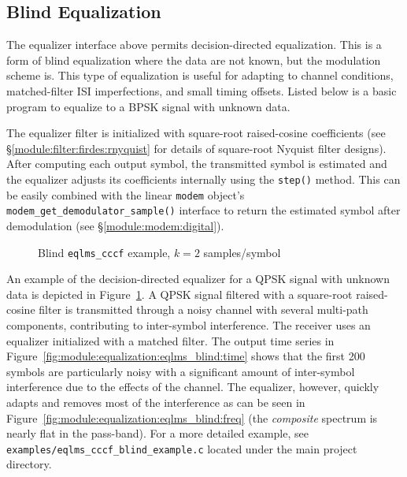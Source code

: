 \subsection{Blind Equalization}
\label{module:equalization:blind}
%
The equalizer interface above permits decision-directed equalization.
This is a form of blind equalization where the data are not known,
but the modulation scheme is.
This type of equalization is useful for adapting to channel conditions,
matched-filter ISI imperfections,
and small timing offsets.
Listed below is a basic program to equalize to a BPSK signal with
unknown data.
%

%
The equalizer filter is initialized with square-root raised-cosine
coefficients
(see \S\ref{module:filter:firdes:rnyquist} for details of square-root
Nyquist filter designs).
After computing each output symbol,
the transmitted symbol is estimated and
the equalizer adjusts its coefficients internally using the
{\tt step()} method.
This can be easily combined with the linear {\tt modem} object's
{\tt modem\_get\_demodulator\_sample()}
interface to return the estimated symbol after demodulation
(see \S\ref{module:modem:digital}).

\begin{figure}
\centering
{}

\caption{Blind {\tt eqlms\_cccf} example, $k=2$ samples/symbol}
\label{fig:module:equalization:eqlms_blind}
\end{figure}
%
An example of the decision-directed equalizer for a QPSK signal with
unknown data is depicted in
Figure~\ref{fig:module:equalization:eqlms_blind}.
A QPSK signal filtered with a square-root raised-cosine filter is
transmitted through a noisy channel with several multi-path components,
contributing to inter-symbol interference.
The receiver uses an equalizer initialized with a matched filter.
The output time series in
Figure~\ref{fig:module:equalization:eqlms_blind:time}
shows that the first 200 symbols are particularly noisy with a
significant amount of inter-symbol interference due to the effects of
the channel.
The equalizer, however, quickly adapts and removes most of the
interference as can be seen in
Figure~\ref{fig:module:equalization:eqlms_blind:freq}
(the {\em composite} spectrum is nearly flat in the pass-band).
%
For a more detailed example, see
{\tt examples/eqlms\_cccf\_blind\_example.c}
located under the main project directory.

